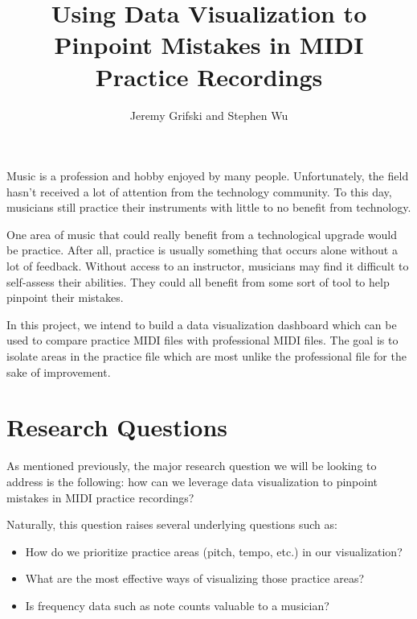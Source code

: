 \documentclass[journal]{vgtc}                %
\title{Using Data Visualization to Pinpoint Mistakes in MIDI Practice Recordings}
\author{Jeremy Grifski and Stephen Wu}
\begin{document}


\maketitle

Music is a profession and hobby enjoyed by many people. Unfortunately, the
field hasn't received a lot of attention from the technology community. To
this day, musicians still practice their instruments with little to no
benefit from technology.

One area of music that could really benefit from a technological upgrade would
be practice. After all, practice is usually something that occurs alone without
a lot of feedback. Without access to an instructor, musicians may find it difficult
to self-assess their abilities. They could all benefit from some sort of tool
to help pinpoint their mistakes.

In this project, we intend to build a data visualization dashboard which can
be used to compare practice MIDI files with professional MIDI files. The goal
is to isolate areas in the practice file which are most unlike the professional
file for the sake of improvement.

\section{Research Questions}

As mentioned previously, the major research question we will be looking to
address is the following: how can we leverage data visualization to pinpoint
mistakes in MIDI practice recordings?

Naturally, this question raises several underlying questions such as:

\begin{itemize}
\item How do we prioritize practice areas (pitch, tempo, etc.) in our visualization?
\item What are the most effective ways of visualizing those practice areas?
\item Is frequency data such as note counts valuable to a musician?
\end{itemize}
\end{document}
